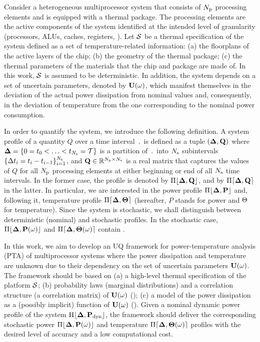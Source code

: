 
Consider a heterogeneous multiprocessor system that consists of ${N_\text{p}}$ processing elements and is equipped with a thermal package. The processing elements are the active components of the system identified at the intended level of granularity (processors, ALUs, caches, registers, \etc). Let $\mathcal{S}$ be a thermal specification of the system defined as a set of temperature-related information: (a) the floorplans of the active layers of the chip; (b) the geometry of the thermal package; (c) the thermal parameters of the materials that the chip and package are made of. In this work, $\mathcal{S}$ is assumed to be deterministic. In addition, the system depends on a set of uncertain parameters, denoted by $\mathbf{U}(\omega)$, which manifest themselves in the deviation of the actual power dissipation from nominal values and, consequently, in the deviation of temperature from the one corresponding to the nominal power consumption.

In order to quantify the system, we introduce the following definition. A system profile of a quantity $Q$ over a time interval $\period$ is defined as a tuple $(\part, \m{Q})$ where $\boldsymbol{\Delta} = \{ 0 = t_0 < \dotsc < t_{N_\text{s}} = \mathcal{T} \}$ is a partition of $\period$ into $N_\text{s}$ subintervals $\{ \Delta t_i = t_i - t_{i - 1} \}_{i = 1}^{N_\text{s}}$, and $\m{Q} \in \real^{\cores \times \steps}$ is a real matrix that captures the values of $Q$ for all ${N_\text{p}}$ processing elements at either beginning or end of all $N_\text{s}$ time intervals. In the former case, the profile is denoted by $\profB{\m{Q}}$, and by $\profE{\m{Q}}$ in the latter. In particular, we are interested in the power profile $\profP$ and, following it, temperature profile $\profT$ (hereafter, $P$ stands for power and $\Theta$ for temperature). Since the system is stochastic, we shall distinguish between deterministic (nominal) and stochastic profiles. In the stochastic case, $\profP{\o}$ and $\profT{\o}$ contain \rvs.

In this work, we aim to develop an UQ framework for power-temperature analysis (PTA) of multiprocessor systems where the power dissipation and temperature are unknown due to their dependency on the set of uncertain parameters $\mathbf{U}(\omega)$. The framework should be based on (a) a high-level thermal specification of the platform $\mathcal{S}$; (b) probability laws (marginal distributions) and a correlation structure (a correlation matrix) of $\mathbf{U}(\omega)$ (); (c) a model of the power dissipation as a (possibly implicit) function of $\mathbf{U}(\omega)$ (). Given a nominal dynamic power profile of the system $\profPdyn$, the framework should deliver the corresponding stochastic power $\profP{\o}$ and temperature $\profT{\o}$ profiles with the desired level of accuracy and a low computational cost.

